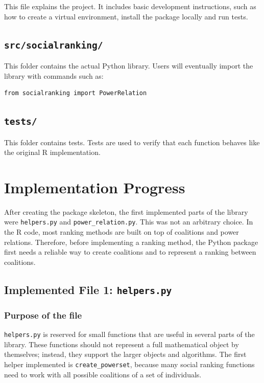 \documentclass[11pt]{article}
\begin{document}
This file explains the project. It includes basic development instructions,
such as how to create a virtual environment, install the package locally and
run tests.

\subsection{\texttt{src/socialranking/}}

This folder contains the actual Python library. Users will eventually import
the library with commands such as:

\begin{verbatim}
from socialranking import PowerRelation
\end{verbatim}

\subsection{\texttt{tests/}}

This folder contains tests. Tests are used to verify that each function behaves
like the original R implementation.


\section{Implementation Progress}

After creating the package skeleton, the first implemented parts of the
library were \texttt{helpers.py} and \texttt{power\_relation.py}. This was not
an arbitrary choice. In the R code, most ranking methods are built on top of
coalitions and power relations. Therefore, before implementing a ranking
method, the Python package first needs a reliable way to create coalitions and
to represent a ranking between coalitions.

\subsection{Implemented File 1: \texttt{helpers.py}}

\subsubsection*{Purpose of the file}

\texttt{helpers.py} is reserved for small functions that are useful in several
parts of the library. These functions should not represent a full mathematical
object by themselves; instead, they support the larger objects and algorithms.
The first helper implemented is \texttt{create\_powerset}, because many social
ranking functions need to work with all possible coalitions of a set of
individuals.
\end{document}
